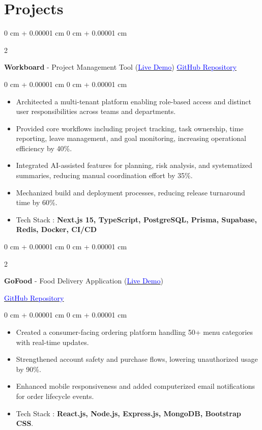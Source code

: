 \documentclass[10pt, letterpaper]{article}
\newenvironment{highlights}{
    \begin{itemize}[
        topsep=0.10 cm,
        parsep=0.10 cm,
        partopsep=0pt,
        itemsep=0pt,
        leftmargin=0.4 cm + 10pt
    ]
}{
    \end{itemize}
} %
\newenvironment{onecolentry}{
    \begin{adjustwidth}{
        0 cm + 0.00001 cm
    }{
        0 cm + 0.00001 cm
    }
}{
    \end{adjustwidth}
} %
\newenvironment{twocolentry}[2][]{
    \onecolentry
    \def\secondColumn{#2}
    \setcolumnwidth{\fill, 4.5 cm}
    \begin{paracol}{2}
}{
    \switchcolumn \raggedleft \secondColumn
    \end{paracol}
    \endonecolentry
} %
\begin{document}
\section{Projects}

    \vspace{0.1 cm}
    
    \begin{twocolentry}{\href{https://github.com/Durga62823/work_board}{\textcolor{blue}{GitHub Repository}}}
        \textbf{Workboard} - Project Management Tool (\href{https://workboard-dev.vercel.app}{\textcolor{blue}{Live Demo}}) \end{twocolentry}

    \vspace{0.10 cm}
    \begin{onecolentry}
        \begin{highlights}
            \item Architected a multi-tenant platform enabling role-based access and distinct user responsibilities across teams and departments.
            \item Provided core workflows including project tracking, task ownership, time reporting, leave management, and goal monitoring, increasing operational efficiency by 40\%.
            \item Integrated AI-assisted features for planning, risk analysis, and systematized summaries, reducing manual coordination effort by 35\%.
            \item Mechanized build and deployment processes, reducing release turnaround time by 60\%.
            \item Tech Stack : \textbf{ Next.js 15, TypeScript, PostgreSQL, Prisma, Supabase, Redis, Docker, CI/CD}
        \end{highlights}
    \end{onecolentry}

    \vspace{0.3 cm}
\begin{twocolentry}{\href{https://github.com/vamsi-lpu18/Food-app}{\textcolor{blue}{GitHub Repository}}}
    \textbf{GoFood} - Food Delivery Application
    (\href{https://food-app-front-end.onrender.com/}{\textcolor{blue}{Live Demo}})
\end{twocolentry}
\vspace{0.2cm}
\begin{onecolentry}
    \begin{highlights}
        \item Created a consumer-facing ordering platform handling 50+ menu categories with real-time updates.
        \item Strengthened account safety and purchase flows, lowering unauthorized usage by 90\%.
        \item Enhanced mobile responsiveness and added computerized email notifications for order lifecycle events.
        \item Tech Stack : \textbf{React.js, Node.js, Express.js, MongoDB, Bootstrap CSS}.
    \end{highlights}
\end{onecolentry}
\end{document}
